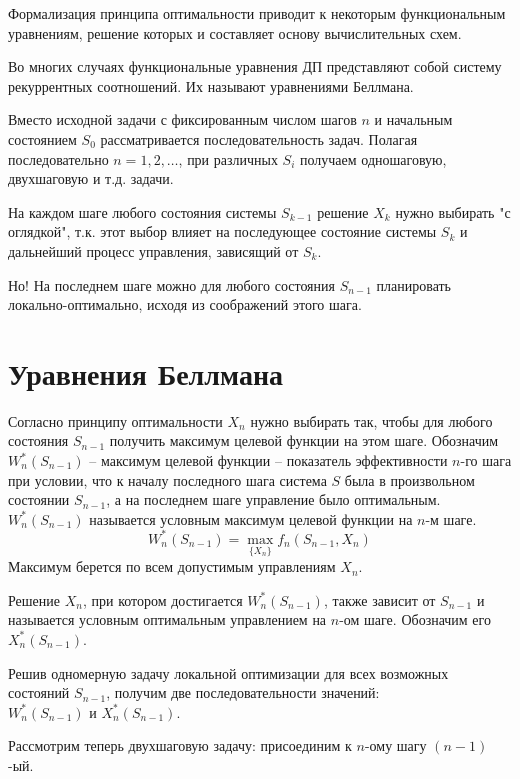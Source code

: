 \documentclass[17pt]{extarticle}
\begin{document}
Формализация принципа оптимальности приводит к некоторым функциональным уравнениям, решение которых и составляет основу вычислительных схем.

Во многих случаях функциональные уравнения ДП представляют собой систему рекуррентных соотношений. Их называют уравнениями Беллмана.

Вместо исходной задачи с фиксированным числом шагов \( n \) и начальным состоянием \( S_0 \) рассматривается последовательность задач.
Полагая последовательно \( n = 1, 2, \ldots \), при различных \( S_i \) получаем одношаговую, двухшаговую и т.д. задачи.

На каждом шаге любого состояния системы \( S_{k-1} \) решение \( X_k \) нужно выбирать "с оглядкой",
т.к. этот выбор влияет на последующее состояние системы \( S_k \) и дальнейший процесс управления, зависящий от \( S_k \).

Но! На последнем шаге можно для любого состояния \( S_{n-1} \) планировать локально-оптимально, исходя из соображений этого шага.

\section*{Уравнения Беллмана}

Согласно принципу оптимальности \( X_n \) нужно выбирать так,
чтобы для любого состояния \( S_{n-1} \) получить максимум целевой функции на этом шаге.
Обозначим $W_n^*(S_{n-1})$ -- максимум целевой функции -- показатель эффективности $n$-го шага при условии,
что к началу последного шага система $S$ была в произвольном состоянии $S_{n-1}$,
а на последнем шаге управление было оптимальным.
$W_n^*(S_{n-1})$ называется условным максимум целевой функции на $n$-м шаге.
\[W_n^*(S_{n-1})=\max_{\{X_n\}}f_n(S_{n-1}, X_n)\]
Максимум берется по всем допустимым управлениям \( X_n \).

Решение \( X_n \), при котором достигается \( W_n^*(S_{n-1}) \),
также зависит от \( S_{n-1} \) и называется условным оптимальным управлением на \( n \)-ом шаге.
Обозначим его \( X_n^*(S_{n-1}) \).

Решив одномерную задачу локальной оптимизации для всех возможных состояний \( S_{n-1} \),
получим две последовательности значений:\\ \( W_n^*(S_{n-1}) \) и \( X_n^*(S_{n-1}) \).

Рассмотрим теперь двухшаговую задачу: присоединим к \( n \)-ому шагу \( (n-1) \)-ый.
\end{document}
